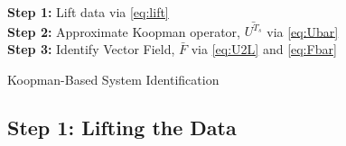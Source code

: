 \begin{algorithm}
\SetAlgoLined
{}
\textbf{Step 1:} Lift data via \eqref{eq:lift} \\
\textbf{Step 2:} Approximate Koopman operator, $\bar{U^{T_s}}$ via \eqref{eq:Ubar} \\
\textbf{Step 3:} Identify Vector Field, $\bar{F}$ via \eqref{eq:U2L} and \eqref{eq:Fbar} \\
\KwOut{$\bar{\Fv}$}
 \caption{Koopman-Based System Identification}
 \label{alg:sysid}
\end{algorithm}


\subsection{Step 1: Lifting the Data}   \label{sec:step1}

